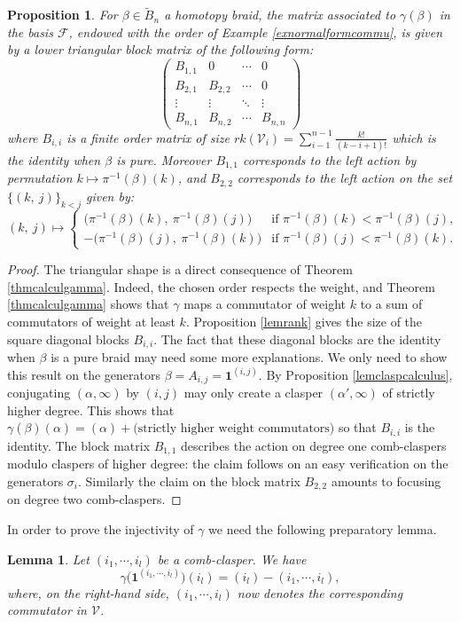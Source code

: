 \documentclass[11pt, a4paper, twoside,reqno]{amsart}
\newtheorem{lem}[thm]{Lemma}
\newtheorem{prop}[thm]{Proposition}
\begin{document}
\begin{prop}\label{propgammamatrix}
For $\beta\in\tilde{B}_n$ a homotopy braid, the matrix associated to $\gamma(\beta)$ in the basis $\mathcal{F}$, endowed with the order of Example \ref{exnormalformcommu}, is given by a lower triangular block matrix of the following form:
\[\begin{pmatrix}
B_{1,1} & 0 & \cdots & 0\\
B_{2,1} & B_{2,2} & \cdots & 0\\
\vdots&  \vdots & \ddots & \vdots\\
B_{n,1} & B_{n,2} & \cdots & B_{n,n}
\end{pmatrix}\]
where $B_{i,i}$ is a finite order matrix of size $rk(\mathcal{V}_i)=\sum_{i-1}^{n-1}\frac{k!}{(k-i+1)!}$ which is the identity when $\beta$ is pure. Moreover $B_{1,1}$ corresponds to the left action by permutation $k \mapsto\pi^{-1}(\beta)(k)$, and $B_{2,2}$ corresponds to the left action on the set $\{(k,\ j)\}_{k<j}$ given by:
\[(k,\ j)\mapsto\left\{\begin{array}{cc}
    \big(\pi^{-1}(\beta)(k),\ \pi^{-1}(\beta)(j)\big)& \mbox{if } \pi^{-1}(\beta)(k)<\pi^{-1}(\beta)(j),\\
    -\big(\pi^{-1}(\beta)(j),\ \pi^{-1}(\beta)(k)\big)& \mbox{if }\pi^{-1}(\beta)(j)<\pi^{-1}(\beta)(k). \end{array}\right.\]
\end{prop}
\begin{proof}
The triangular shape is a direct consequence of Theorem \ref{thmcalculgamma}. Indeed, the chosen order respects the weight, and Theorem \ref{thmcalculgamma} shows that $\gamma$ maps a commutator of weight $k$ to a sum of commutators of weight at least $k$. Proposition \ref{lemrank} gives the size of the square diagonal blocks $B_{i,i}$. The fact that these diagonal blocks are the identity when $\beta$ is a pure braid may need some more explanations. We only need to show this result on the generators $\beta=A_{i,j}=\mathbf1^{(i,j)}$. By Proposition \ref{lemclaspcalculus}, conjugating $(\alpha,\infty)$ by $(i,j)$ may only create a clasper $(\alpha',\infty)$ of strictly higher degree. This shows that $\gamma(\beta)(\alpha)=(\alpha)+\mbox{(strictly higher weight commutators)}$ so that $B_{i,i}$ is the identity. The block matrix $B_{1,1}$ describes the action on degree one comb-claspers modulo claspers of higher degree: the claim follows on an easy verification on the generators $\sigma_i$. Similarly the claim on the block matrix $B_{2,2}$ amounts to focusing on degree two comb-claspers.
\end{proof}
In order to prove the injectivity of $\gamma$ we need the following preparatory lemma. 
\begin{lem}\label{lemsondage}
Let $(i_1,\cdots,i_l)$ be a comb-clasper. We have $$\gamma\big(\mathbf{1}^{(i_1,\cdots,i_l)}\big)(i_l)=(i_l)-(i_1,\cdots,i_l),$$ where, on the right-hand side, $(i_1,\cdots,i_l)$ now denotes the corresponding commutator in $\mathcal V$.
\end{lem}
\end{document}
